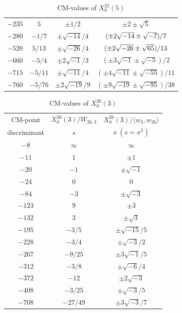 \documentclass{amsart}
\theoremstyle{definition}
\begin{document}
\begin{appendices}
\begin{table}
\begin{tabular}{|c|c|c|c|}
${-235}$ & $5$ & $\pm{ 1}/{2}$ & $\pm 2\pm \sqrt{5}$ \\
${-280}$ & $-{1}/{7}$ & $\pm{ \sqrt{-14}}/{4}$ & $(\pm 2\sqrt{%
-14}\pm \sqrt{-7})/{7}$ \\
${-520}$ & ${5}/{13}$ & $\pm \sqrt{-26}/{4}$ & $(\pm 2\sqrt{%
-26}\pm \sqrt{65})/{13}$ \\ 
${-660}$ & $-{5}/{4}$ & $\pm{ 2\sqrt{-1}}/{3}$ & $(\pm 3\sqrt{-1}\pm \sqrt{-5}%
)/{2}$ \\ 
${-715}$ & $-{5}/{11}$ & $\pm \sqrt{-11}/{4}$ & $(\pm 4%
\sqrt{-11}\pm \sqrt{-55})/{11}$ \\ 
${-760}$ & $-{5}/{76}$ & $\pm{ 2\sqrt{-19}}/{9}$ & $(\pm 9%
\sqrt{-19}\pm \sqrt{-95})/{38}$ \\ \hline
\end{tabular}
\bigskip
\caption{CM-values of $X^{22}_0(5)$}
\end{table}
\clearpage

\renewcommand{\arraystretch}{1.5}
\tabcolsep=10pt                         
\begin{table}
\begin{tabular}{|c|c|c|}
\hline
CM-point& $X_{0}^{26}\left( 3\right) /W_{26,3}$ & $X_{0}^{26}\left( 3\right)/\langle w_{3},w_{26}\rangle $ \\

discriminant& $s$ & $x\ (s=x^2)$ \\ \hline
${-8}$ & $\infty $ & $\infty $ \\ 
${-11}$ & $1$ & $\pm 1$ \\ 
${-20}$ & $-1$ & $\pm \sqrt{-1}$ \\
${-24}$ & $0$ & $0$ \\ 
${-84}$ & $-3$ & $\pm \sqrt{-3}$ \\ 
${-123}$ & $9$ & $\pm 3$ \\ 
${-132}$ & $3$ & $\pm \sqrt{3}$ \\ 
${-195}$ & $-{3}/{5}$ & $\pm{ \sqrt{-15}}/{5}$ \\ 
${-228}$ & $-{3}/{4}$ & $\pm {\sqrt{-3}}/{2}$ \\ 
${-267}$ & $-{9}/{25}$ & $\pm{3 \sqrt{-1}}/{5}$ \\ 
${-312}$ & $-{3}/{8}$ & $\pm{\sqrt{-6}}/{4}$ \\ 
${-372}$ & $-12$ & $\pm 2\sqrt{-3}$ \\ 
${-408}$ & $-{3}/{25}$ & $\pm{ \sqrt{-3}}/{5}$ \\
${-708}$ & $-{27}/{49}$ & $\pm{ 3\sqrt{-3}}/{7}$ \\ \hline
\end{tabular}
\bigskip
\caption{CM-values of $X^{26}_0(3)$}


\end{table}
\end{appendices}
\end{document}
